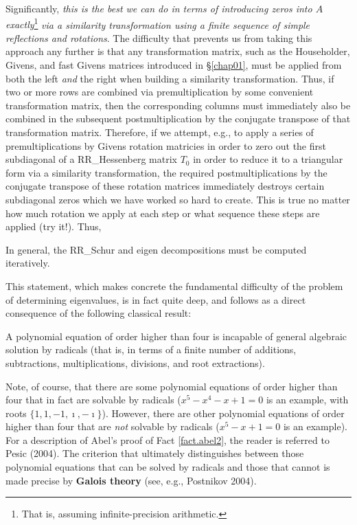 Significantly, {\it this is the best we can do in terms of introducing zeros into $A$ exactly}\footnote{That is, assuming infinite-precision
arithmetic.} {\it via a similarity transformation using a finite sequence of simple reflections and rotations}.  The difficulty that prevents
us from taking this approach any further is that any transformation matrix, such as the Householder, Givens, and fast Givens matrices introduced in
\S \ref{chap01}, must be applied from both the left {\it and} the right when building a similarity transformation.  Thus, if two or more rows are combined
via premultiplication by some convenient transformation matrix, then the corresponding columns must immediately also be combined in the subsequent
postmultiplication by the 
conjugate transpose of that transformation matrix.  Therefore, if we attempt, e.g., to apply a series of premultiplications by Givens rotation matricies in
order to zero out the first subdiagonal of a RR_Hessenberg matrix $T_0$ in order to reduce it to a triangular form via a similarity transformation, the required
postmultiplications by the conjugate transpose of these rotation matrices immediately destroys certain subdiagonal zeros which we have worked so hard
to create.  This is true no matter how much rotation we apply at each step or what sequence these steps are applied (try it!).  Thus,

\begin{fact} \label{fact.abel1}
In general, the RR_Schur and eigen decompositions must be computed iteratively.
\end{fact}

\noindent This statement, which makes concrete the fundamental difficulty of the problem of determining eigenvalues,
is in fact quite deep, and follows as a direct consequence of the following classical result: 

\begin{fact} \label{fact.abel2} 
A polynomial equation of order higher than four is incapable of general algebraic solution by radicals
(that is, in terms of a finite number of additions, subtractions, multiplications, divisions, and root extractions). 
\end{fact}

\noindent Note, of course, that there are some polynomial equations of order higher than four that in fact are solvable
by radicals ($x^5-x^4-x+1=0$ is an example, with roots $\{1,1,-1,\imath,-\imath\}$).
However, there are other polynomial equations of order higher than four that are {\it not} solvable by radicals ($x^5-x+1=0$ is an example).
For a description of Abel's proof of Fact \ref{fact.abel2}, the reader is referred to Pesic (2004).
The criterion that ultimately distinguishes between those polynomial equations that can be solved by radicals and those that cannot is made precise
by {\bf Galois theory} (see, e.g., Postnikov 2004).

